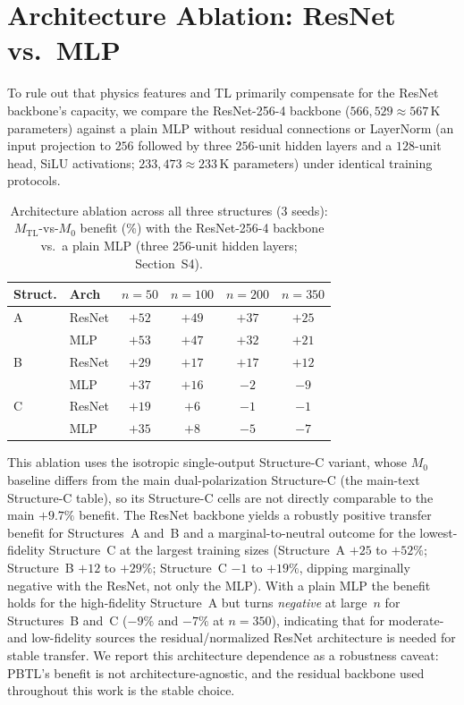 \documentclass[11pt]{article}
\newcommand{\Mzero}{\ensuremath{M_0}}
\newcommand{\Mtl}{\ensuremath{M_\text{TL}}}
\begin{document}
\section{Architecture Ablation: ResNet vs.\ MLP}
\label{sec:si_arch}

To rule out that physics features and TL primarily compensate for the ResNet backbone's capacity, we compare the ResNet-256-4 backbone ($566{,}529 \approx 567$\,K parameters) against a plain MLP without residual connections or LayerNorm (an input projection to $256$ followed by three $256$-unit hidden layers and a $128$-unit head, SiLU activations; $233{,}473 \approx 233$\,K parameters) under identical training protocols.

\begin{table}[htbp]\centering\small
\caption{Architecture ablation across all three structures (3 seeds): $\Mtl$-vs-$\Mzero$ benefit (\%) with the ResNet-256-4 backbone vs.\ a plain MLP (three $256$-unit hidden layers; Section~S4).}
\label{tab:arch_ablation}
\begin{tabular}{ll cccc}\toprule
\textbf{Struct.} & \textbf{Arch} & $n{=}50$ & $n{=}100$ & $n{=}200$ & $n{=}350$\\\midrule
A & ResNet & $+52$ & $+49$ & $+37$ & $+25$\\
  & MLP    & $+53$ & $+47$ & $+32$ & $+21$\\\midrule
B & ResNet & $+29$ & $+17$ & $+17$ & $+12$\\
  & MLP    & $+37$ & $+16$ & $-2$  & $-9$\\\midrule
C & ResNet & $+19$ & $+6$  & $-1$  & $-1$\\
      & MLP    & $+35$ & $+8$  & $-5$  & $-7$\\\bottomrule
\end{tabular}
\end{table}

This ablation uses the isotropic single-output Structure-C variant, whose $\Mzero$ baseline differs from the main dual-polarization Structure-C (the main-text Structure-C table), so its Structure-C cells are not directly comparable to the main $+9.7\%$ benefit. The ResNet backbone yields a robustly positive transfer benefit for Structures~A and~B and a marginal-to-neutral outcome for the lowest-fidelity Structure~C at the largest training sizes (Structure~A $+25$ to $+52\%$; Structure~B $+12$ to $+29\%$; Structure~C $-1$ to $+19\%$, dipping marginally negative with the ResNet, not only the MLP). With a plain MLP the benefit holds for the high-fidelity Structure~A but turns \emph{negative} at large~$n$ for Structures~B and~C ($-9\%$ and $-7\%$ at $n=350$), indicating that for moderate- and low-fidelity sources the residual/normalized ResNet architecture is needed for stable transfer. We report this architecture dependence as a robustness caveat: PBTL's benefit is not architecture-agnostic, and the residual backbone used throughout this work is the stable choice.
\end{document}
